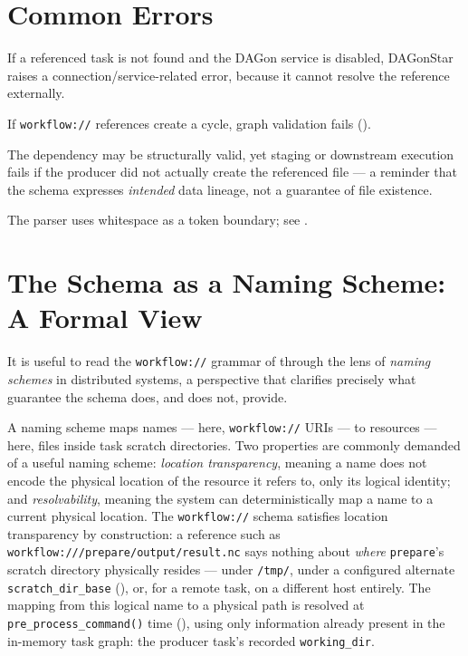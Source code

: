 \section{Common Errors}

\begin{description}[leftmargin=1.8em,style=nextline]
  \item[Missing producer task] If a referenced task is not found and the
    DAGon service is disabled, DAGonStar raises a connection/service-related
    error, because it cannot resolve the reference externally.
  \item[Dependency cycle] If \texttt{workflow://} references create a cycle,
    graph validation fails ().
  \item[Wrong path inside producer task] The dependency may be structurally
    valid, yet staging or downstream execution fails if the producer did not
    actually create the referenced file --- a reminder that the schema
    expresses \emph{intended} data lineage, not a guarantee of file
    existence.
  \item[Path contains spaces] The parser uses whitespace as a token
    boundary; see .
\end{description}

\section{The Schema as a Naming Scheme: A Formal View}
\label{sec:schema-formal}

It is useful to read the \texttt{workflow://} grammar of
 through the lens of \emph{naming schemes} in distributed
systems, a perspective that clarifies precisely what guarantee the schema
does, and does not, provide.

A naming scheme maps names --- here, \texttt{workflow://} URIs --- to
resources --- here, files inside task scratch directories. Two properties
are commonly demanded of a useful naming scheme: \emph{location
transparency}, meaning a name does not encode the physical location of the
resource it refers to, only its logical identity; and \emph{resolvability},
meaning the system can deterministically map a name to a current physical
location. The \texttt{workflow://} schema satisfies location transparency by
construction: a reference such as \texttt{workflow:///prepare/output/result.nc}
says nothing about \emph{where} \texttt{prepare}'s scratch directory
physically resides --- under \texttt{/tmp/}, under a configured alternate
\texttt{scratch\_dir\_base} (), or, for a remote task,
on a different host entirely. The mapping from this logical name to a
physical path is resolved at \texttt{pre\_process\_command()} time
(), using only information already present in
the in-memory task graph: the producer task's recorded \texttt{working\_dir}.

